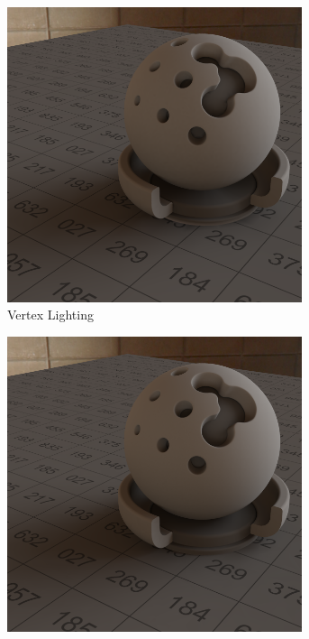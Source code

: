 \begin{figure}[h]
\begin{subfigure}[t]{0.245\textwidth}
			\includegraphics[width=0.95\textwidth]{pic/irrmap-shaderball_e-vmap.png}
			\caption{Vertex Lighting}
		\end{subfigure}
		\begin{subfigure}[t]{0.245\textwidth}
			\center
			\includegraphics[width=0.95\textwidth]{pic/irrmap-shaderball_e-irrmap.png}

\end{subfigure}
\end{figure}
